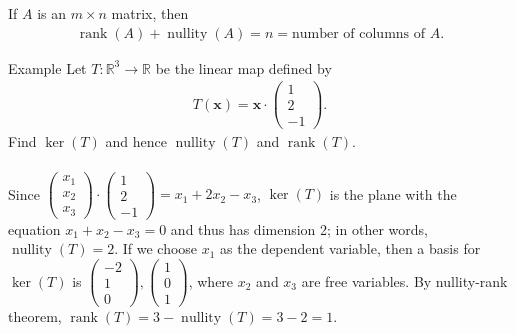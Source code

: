 \documentclass{report}
\renewcommand{\vec}{\mathbf}
\newcommand{\Ker}{\operatorname{ker}}
\newcommand{\Nullity}{\operatorname{nullity}}
\newcommand{\Rank}{\operatorname{rank}}
\newcommand{\cvec}[1]{ \begin{pmatrix} #1 \end{pmatrix} }
\begin{document}
\begin{enumerate}
	If $A$ is an $m \times n$ matrix, then
	\begin{align*}
		\Rank(A) + \Nullity(A) = n = \text{number of columns of } A.
	\end{align*}

	\begin{question}{Example}
		Let $T: \mathbb{R}^3 \to \mathbb{R}$ be the linear map defined by 
		\begin{align*}
			T(\vec{x}) = \vec{x} \cdot \cvec{1\\2\\-1}.
		\end{align*}
		Find $\Ker(T)$ and hence $\Nullity(T)$ and $\Rank(T)$.
		\\ \\
		Since $\cvec{x_1\\x_2\\x_3} \cdot \cvec{1\\2\\-1} = x_1 + 2x_2 - x_3$, $\Ker(T)$ is the plane with the equation $x_1 + x_2 - x_3 = 0$ and thus has dimension 2; in other words, $\Nullity(T) = 2$. If we choose $x_1$ as the dependent variable, then a basis for $\Ker(T)$ is $\cvec{-2\\1\\0}, \cvec{1\\0\\1}$, where $x_2$ and $x_3$ are free variables. By nullity-rank theorem, $\Rank(T) = 3 - \Nullity(T) = 3 - 2 = 1$.
	\end{question}


\end{enumerate}
\end{document}
